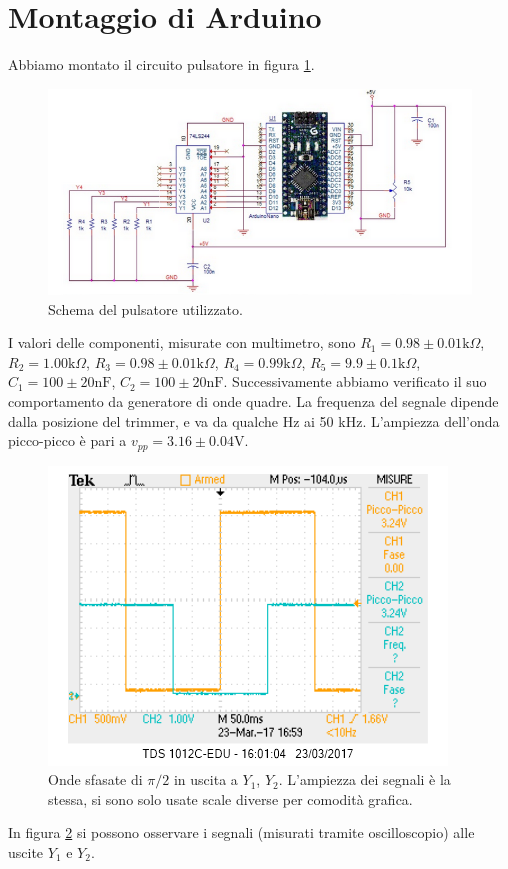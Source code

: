 \documentclass[10pt,a4paper]{article}
\begin{document}
\section{Montaggio di Arduino}
Abbiamo montato il circuito pulsatore in figura \ref{fig:arduino}.
\begin{figure}[!htb]
\centering
\includegraphics[scale=0.7]{arduino.png}
\caption{Schema del pulsatore utilizzato.\label{fig:arduino}}
\end{figure}
I valori delle componenti, misurate con multimetro, sono $R_1 = 0.98\pm 0.01\mbox{k}\Omega$, $R_2 = 1.00\mbox{k}\Omega$, $R_3 = 0.98 \pm 0.01\mbox{k}\Omega$, $R_4 = 0.99\mbox{k}\Omega$, $R_5 = 9.9\pm 0.1\mbox{k}\Omega$, $C_1 = 100 \pm 20 \mbox{nF}$, $C_2 = 100\pm 20\mbox{nF}$.
Successivamente abbiamo verificato il suo comportamento da generatore di onde quadre. La frequenza del segnale dipende dalla posizione del trimmer, e va da qualche Hz ai 50 kHz. L'ampiezza dell'onda picco-picco è pari a $v_{pp}=3.16\pm 0.04$V.
\begin{figure}[!htb]
\centering
\includegraphics[scale=0.7]{ondaardu.png}
\caption{Onde sfasate di $\pi/2$ in uscita a $Y_1$, $Y_2$. L'ampiezza dei segnali è la stessa, si sono solo usate scale diverse per comodità grafica.\label{fig:ondaardu}}
\end{figure}
In figura \ref{fig:ondaardu} si possono osservare i segnali (misurati tramite oscilloscopio) alle uscite $Y_1$ e $Y_2$.
\end{document}
